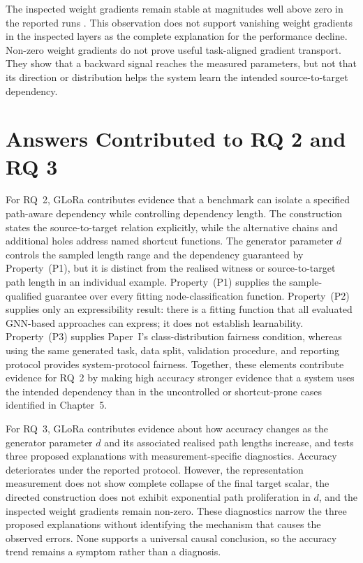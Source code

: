 The inspected weight gradients remain stable at magnitudes well above zero in the reported runs \cite{zhou2025glora}.
This observation does not support vanishing weight gradients in the inspected layers as the complete explanation for the performance decline.
Non-zero weight gradients do not prove useful task-aligned gradient transport.
They show that a backward signal reaches the measured parameters, but not that its direction or distribution helps the system learn the intended source-to-target dependency.

\section{Answers Contributed to RQ 2 and RQ 3}

For RQ~2, GLoRa contributes evidence that a benchmark can isolate a specified path-aware dependency while controlling dependency length.
The construction states the source-to-target relation explicitly, while the alternative chains and additional holes address named shortcut functions.
The generator parameter $d$ controls the sampled length range and the dependency guaranteed by Property~(P1), but it is distinct from the realised witness or source-to-target path length in an individual example.
Property~(P1) supplies the sample-qualified guarantee over every fitting node-classification function.
Property~(P2) supplies only an expressibility result: there is a fitting function that all evaluated GNN-based approaches can express; it does not establish learnability.
Property~(P3) supplies Paper~I's class-distribution fairness condition, whereas using the same generated task, data split, validation procedure, and reporting protocol provides system-protocol fairness.
Together, these elements contribute evidence for RQ~2 by making high accuracy stronger evidence that a system uses the intended dependency than in the uncontrolled or shortcut-prone cases identified in Chapter~5.

For RQ~3, GLoRa contributes evidence about how accuracy changes as the generator parameter $d$ and its associated realised path lengths increase, and tests three proposed explanations with measurement-specific diagnostics.
Accuracy deteriorates under the reported protocol.
However, the representation measurement does not show complete collapse of the final target scalar, the directed construction does not exhibit exponential path proliferation in $d$, and the inspected weight gradients remain non-zero.
These diagnostics narrow the three proposed explanations without identifying the mechanism that causes the observed errors.
None supports a universal causal conclusion, so the accuracy trend remains a symptom rather than a diagnosis.


